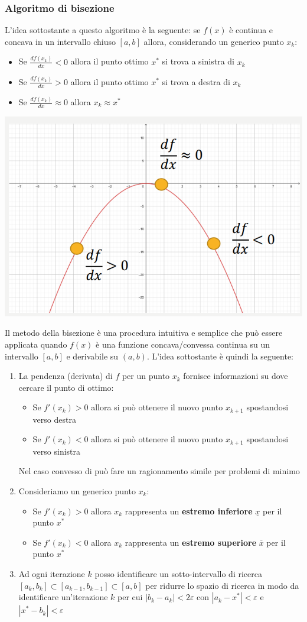 \documentclass[12pt]{article}
\begin{document}
\subsubsection{Algoritmo di bisezione}
L'idea sottostante a questo algoritmo è la seguente: se $f(x)$ è continua e concava in un intervallo chiuso $[a,b]$ allora, considerando un generico punto $x_k$:
\begin{itemize}
    \item Se $\frac{df(x_k)}{dx} < 0$ allora il punto ottimo $x^*$ si trova a sinistra di $x_k$
    \item Se $\frac{df(x_k)}{dx} > 0$ allora il punto ottimo $x^*$ si trova a destra di $x_k$
    \item Se $\frac{df(x_k)}{dx} \approx 0$ allora $x_k \approx x^*$
\end{itemize}
\begin{center}
    \includegraphics[width = 0.40\linewidth]{Images/94.png}
\end{center}
Il metodo della bisezione è una procedura intuitiva e semplice che può essere applicata quando $f(x)$ è una funzione concava/convessa continua
su un intervallo $[a,b]$ e derivabile su $(a,b)$.
L'idea sottostante è quindi la seguente:
\begin{enumerate}
    \item La pendenza (derivata) di $f$ per un punto $x_k$ fornisce informazioni su dove cercare il punto di ottimo:
    \begin{itemize}
        \item Se $f'(x_k) > 0$ allora si può ottenere il nuovo punto $x_{k+1}$ spostandosi verso destra
        \item Se $f'(x_k) < 0$ allora si può ottenere il nuovo punto $x_{k+1}$ spostandosi verso sinistra
    \end{itemize}
    Nel caso convesso di può fare un ragionamento simile per problemi di minimo
    \item Consideriamo un generico punto $x_k$:
    \begin{itemize}
        \item Se $f'(x_k) > 0$ allora $x_k$ rappresenta un \textbf{estremo inferiore} $\underline{x}$ per il punto $x^*$
        \item Se $f'(x_k) < 0$ allora $x_k$ rappresenta un \textbf{estremo superiore} $\overline{x}$ per il punto $x^*$ 
    \end{itemize}
    \item Ad ogni iterazione $k$ posso identificare un sotto-intervallo di ricerca $[a_k, b_k] \subset [a_{k-1}, b_{k-1}] \subset [a,b]$ per ridurre lo spazio di ricerca in modo da identificare un'iterazione $k$ per cui $|b_k - a_k| < 2 \varepsilon$ con
    $|a_k - x^*| < \varepsilon$ e $|x^* - b_k| < \varepsilon$
\end{enumerate}
\end{document}

